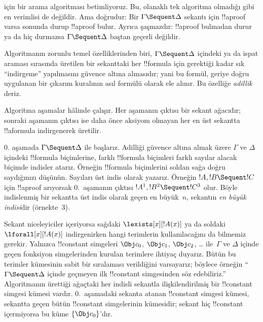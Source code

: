 



 için bir arama algoritması betimliyoruz. Bu, olanaklı tek
algoritma olmadığı gibi en verimlisi de değildir. Ama doğrudur: Bir
$\Gamma \Sequent \Delta$ sekantı için !!a{proof} varsa sonunda durup
!!a{proof} bulur. Ayrıca şaşmazdır: !!a{proof} bulmadan durur ya da hiç
durmazsa $\Gamma \Sequent \Delta$ baştan geçerli değildir.

Algoritmanın zorunlu temel özelliklerinden biri, $\Gamma \Sequent \Delta$
içindeki ya da ispat araması sırasında üretilen bir sekanttaki her
!!{formula} için gerektiği kadar sık ``indirgeme'' yapılmasını güvence altına
almasıdır; yani bu formül, geriye doğru uygulanan bir çıkarım kuralının
asıl formülü olarak ele alınır. Bu özelliğe \emph{adillik} deriz.

Algoritma aşamalar hâlinde çalışır. Her aşamanın çıktısı bir sekant ağacıdır;
sonraki aşamanın çıktısı ise daha önce aksiyom olmayan her en üst sekantta
!!a{formula} indirgenerek üretilir.

$0$. aşamada $\Gamma \Sequent \Delta$ ile başlarız. Adilliği güvence altına
almak üzere $\Gamma$ ve $\Delta$ içindeki !!{formula} biçimlerine, farklı
!!{formula} biçimleri farklı sayılar alacak biçimde indisler atarız.
Örneğin !!{formula} biçimlerini soldan sağa doğru saydığınızı düşünün. Sayıları üst indis
olarak yazarız. Örneğin $!A, !B \Sequent !C$ için !!a{proof} arıyorsak
$0$.~aşamanın çıktısı $!A^1, !B^2 \Sequent !C^3$ olur. Böyle indislenmiş bir
sekantta üst indis olarak geçen en büyük~$n$, sekantın \emph{en büyük indisi}dir
(örnekte~$3$).

Sekant niceleyiciler içeriyorsa sağdaki $\lexists[x][!A(x)]$ ya da soldaki
$\lforall[x][!A(x)]$ indirgenirken hangi terimlerin kullanılacağını da
bilmemiz gerekir. Yalnızca !!{constant} simgeleri $\Obj c_0$, $\Obj c_1$, $\Obj c_2$,
\dots{} ile~$\Gamma$ ve $\Delta$ içinde geçen fonksiyon simgelerinden
kurulan terimlere ihtiyaç duyarız. Bütün bu terimler kümesinin sabit bir
sıralaması verildiğini varsayarız; böylece örneğin ``$\Gamma \Sequent
\Delta$ içinde geçmeyen ilk !!{constant} simgesinden söz edebiliriz.'' Algoritmanın
ürettiği ağaçtaki her indisli sekantla ilişkilendirilmiş bir !!{constant}
simgesi kümesi vardır. $0$.~aşamadaki sekanta atanan !!{constant} simgesi kümesi, sekantta
geçen bütün !!{constant} simgelerinin kümesidir; sekant hiç !!{constant} içermiyorsa bu
küme $\{\Obj c_0\}$'dır.

